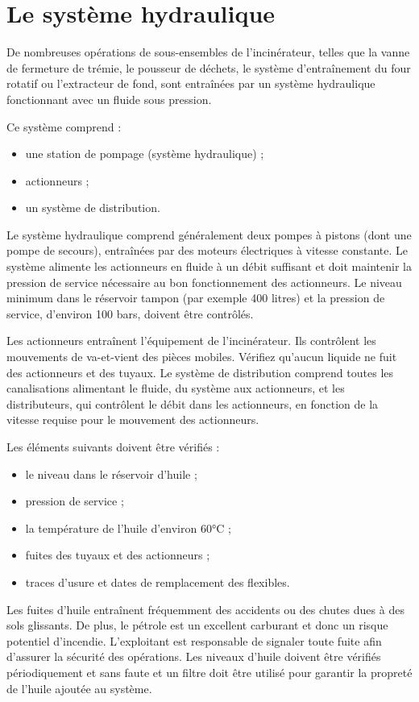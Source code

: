 \section{Le système hydraulique}


De nombreuses opérations de sous-ensembles de l'incinérateur, telles que la vanne de fermeture de trémie, le pousseur de déchets, le système d'entraînement du four rotatif ou l'extracteur de fond, sont entraînées par un système hydraulique fonctionnant avec un fluide sous pression.

Ce système comprend :
\begin{itemize}
    \item une station de pompage (système hydraulique) ;
    \item actionneurs ;
    \item un système de distribution.
\end{itemize}


Le système hydraulique comprend généralement deux pompes à pistons (dont une pompe de secours), entraînées par des moteurs électriques à vitesse constante. Le système alimente les actionneurs en fluide à un débit suffisant et doit maintenir la pression de service nécessaire au bon fonctionnement des actionneurs.
Le niveau minimum dans le réservoir tampon (par exemple 400 litres) et la pression de service, d'environ 100 bars, doivent être contrôlés.

Les actionneurs entraînent l'équipement de l'incinérateur. Ils contrôlent les mouvements de va-et-vient des pièces mobiles.
Vérifiez qu'aucun liquide ne fuit des actionneurs et des tuyaux.
Le système de distribution comprend toutes les canalisations alimentant le fluide, du système aux actionneurs, et les distributeurs, qui contrôlent le débit dans les actionneurs, en fonction de la vitesse requise pour le mouvement des actionneurs.

Les éléments suivants doivent être vérifiés :
\begin{itemize}
    \item le niveau dans le réservoir d'huile ;
    \item pression de service ;
    \item la température de l'huile d'environ 60°C ;
    \item fuites des tuyaux et des actionneurs ;
    \item traces d'usure et dates de remplacement des flexibles.
\end{itemize}

Les fuites d'huile entraînent fréquemment des accidents ou des chutes dues à des sols glissants. De plus, le pétrole est un excellent carburant et donc un risque potentiel d'incendie. 
L'exploitant est responsable de signaler toute fuite afin d'assurer la sécurité des opérations. Les niveaux d'huile doivent être vérifiés périodiquement et sans faute et un filtre doit être utilisé pour garantir la propreté de l'huile ajoutée au système.

